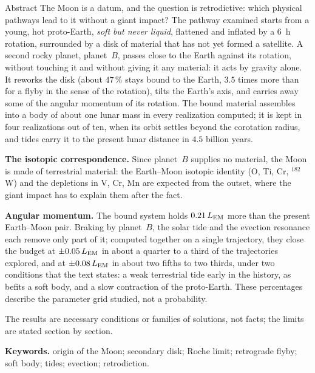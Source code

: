 \documentclass[11pt,a4paper]{article}
\newcommand{\LEM}{\ensuremath{L_{\rm EM}}}
\begin{document}
\begin{encadre}{Abstract}
\small
The Moon is a datum, and the question is retrodictive: which physical pathways lead to it without a giant impact? The pathway examined starts from a young, hot proto-Earth, \emph{soft but never liquid}, flattened and inflated by a 6~h rotation, surrounded by a disk of material that has not yet formed a satellite. A second rocky planet, planet~$B$, passes close to the Earth against its rotation, without touching it and without giving it any material: it acts by gravity alone. It reworks the disk (about $47\,\%$ stays bound to the Earth, $3.5$ times more than for a flyby in the sense of the rotation), tilts the Earth's axis, and carries away some of the angular momentum of its rotation. The bound material assembles into a body of about one lunar mass in every realization computed; it is kept in four realizations out of ten, when its orbit settles beyond the corotation radius, and tides carry it to the present lunar distance in $4.5$ billion years.

\smallskip
\textbf{The isotopic correspondence.} Since planet~$B$ supplies no material, the Moon is made of terrestrial material: the Earth--Moon isotopic identity (O, Ti, Cr, $^{182}$W) and the depletions in V, Cr, Mn are expected from the outset, where the giant impact has to explain them after the fact.

\smallskip
\textbf{Angular momentum.} The bound system holds $0.21\,\LEM$ more than the present Earth--Moon pair. Braking by planet~$B$, the solar tide and the evection resonance each remove only part of it; computed together on a single trajectory, they close the budget at $\pm0.05\,\LEM$ in about a quarter to a third of the trajectories explored, and at $\pm0.08\,\LEM$ in about two fifths to two thirds, under two conditions that the text states: a weak terrestrial tide early in the history, as befits a soft body, and a slow contraction of the proto-Earth. These percentages describe the parameter grid studied, not a probability.

\smallskip
The results are necessary conditions or families of solutions, not facts; the limits are stated section by section.

\smallskip
\textbf{Keywords.} origin of the Moon; secondary disk; Roche limit; retrograde flyby; soft body; tides; evection; retrodiction.
\end{encadre}

\newpage
\tableofcontents
\newpage

\end{document}
